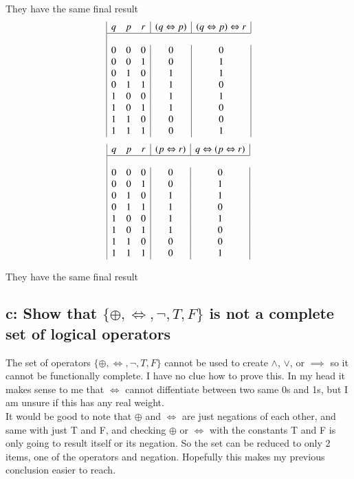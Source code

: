 \documentclass{article}
\begin{document}
They have the same final result
\begin{displaymath}
  \begin{array}{|c c c|c|c|c|c|}
    q & p & r & (q \Leftrightarrow p) & (q \Leftrightarrow p) \Leftrightarrow r \\
    \hline \\
    0 & 0 & 0 & 0 & 0\\
    0 & 0 & 1 & 0 & 1\\
    0 & 1 & 0 & 1 & 1\\
    0 & 1 & 1 & 1 & 0\\
    1 & 0 & 0 & 1 & 1\\
    1 & 0 & 1 & 1 & 0\\
    1 & 1 & 0 & 0 & 0\\
    1 & 1 & 1 & 0 & 1\\
  \end{array}
\end{displaymath}
\begin{displaymath}
  \begin{array}{|c c c|c|c|c|c|}
    q & p & r & (p \Leftrightarrow r) & q \Leftrightarrow (p \Leftrightarrow r) \\
    \hline \\
    0 & 0 & 0 & 0 & 0\\
    0 & 0 & 1 & 0 & 1\\
    0 & 1 & 0 & 1 & 1\\
    0 & 1 & 1 & 1 & 0\\
    1 & 0 & 0 & 1 & 1\\
    1 & 0 & 1 & 1 & 0\\
    1 & 1 & 0 & 0 & 0\\
    1 & 1 & 1 & 0 & 1\\
  \end{array}
\end{displaymath}

They have the same final result 
\subsection*{c: Show that $\{\oplus, \Leftrightarrow, \neg, T, F\}$ is not a complete set of logical operators}
The set of operators $\{\oplus, \Leftrightarrow, \neg, T, F\}$ cannot be used to create $\land$, $\lor$, or $\implies$ so it cannot be functionally complete. I have no clue how to prove this. In my head it makes sense to me that $\Leftrightarrow$ cannot diffentiate between two same 0s and 1s, but I am unsure if this has any real weight.\\
It would be good to note that $\oplus$ and $\Leftrightarrow$ are just negations of each other, and same with just T and F, and checking $\oplus$ or $\Leftrightarrow$ with the constants T and F is only going to result itself or its negation. So the set can be reduced to only 2 items, one of the operators and negation. Hopefully this makes my previous conclusion easier to reach.
\end{document}
